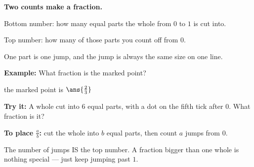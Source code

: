\documentclass[12pt]{article}
\begin{document}


\begin{formulabox}
\textbf{Two counts make a fraction.}\par
Bottom number: how many equal parts the whole from $0$ to $1$ is cut into.\par
Top number: how many of those parts you count off from $0$.\par
One part is one jump, and the jump is always the same size on one line.
\end{formulabox}

\begin{examplebox}
\textbf{Example:} \quad What fraction is the marked point?
\par\vspace{2pt}
\begin{center}
\end{center}

the marked point is $\ans{\tfrac{2}{3}}$
\end{examplebox}

\begin{tryitbox}
\textbf{Try it:} \quad A whole cut into $6$ equal parts, with a dot on the fifth tick after $0$.
What fraction is it?\\[2pt]
\end{tryitbox}


\begin{formulabox}
\textbf{To place $\frac{a}{b}$:} cut the whole into $b$ equal parts, then count $a$ jumps from $0$.\par
The number of jumps IS the top number. A fraction bigger than one whole is nothing special --- just
keep jumping past $1$.
\end{formulabox}
\end{document}
